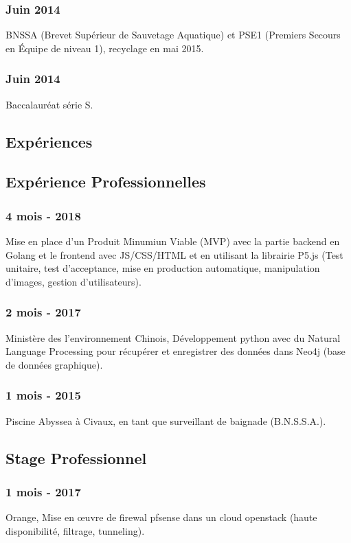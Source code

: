 \documentclass{article}
\begin{document}
        \subsubsection{Juin 2014}
            BNSSA (Brevet Sup\'erieur de Sauvetage Aquatique) et PSE1 (Premiers Secours en \'Equipe de niveau 1), recyclage en mai 2015.
        \subsubsection{Juin 2014}
            Baccalaur\'eat s\'erie S.

    \vspace{1cm}

    \begin{multicols}{2}
        \section{Exp\'eriences}
            \subsection{Exp\'erience Professionnelles}
                \subsubsection{4 mois - 2018}
                    Mise en place d'un Produit Minumiun Viable (MVP) avec la partie backend en Golang et le frontend avec JS/CSS/HTML et en utilisant la librairie P5.js (Test unitaire, test d'acceptance, mise en production automatique, manipulation d'images, gestion d'utilisateurs).
                \subsubsection{2 mois - 2017}
                    Minist\`ere des l'environnement Chinois, D\'eveloppement python avec du Natural Language Processing pour r\'ecup\'erer et enregistrer des donn\'ees dans Neo4j (base de donn\'ees graphique).
                \subsubsection{1 mois - 2015}
                    Piscine Abyssea \`a Civaux, en tant que surveillant de baignade (B.N.S.S.A.).
            \subsection{Stage Professionnel}
                \subsubsection{1 mois - 2017}
                    Orange, Mise en \oe{}uvre de firewal pfsense dans un cloud openstack (haute disponibilit\'e, filtrage, tunneling).

\end{multicols}
\end{document}
